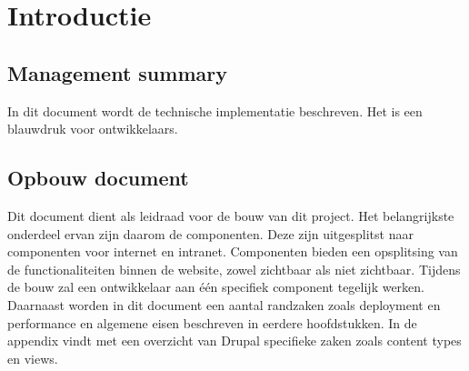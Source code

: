 
\section{Introductie}

\subsection{Management summary}
In dit document wordt de technische implementatie beschreven. Het is een blauwdruk voor ontwikkelaars. 

\subsection{Opbouw document}
Dit document dient als leidraad voor de bouw van dit project. Het belangrijkste onderdeel ervan zijn daarom de componenten. Deze zijn uitgesplitst naar componenten voor internet en intranet.  Componenten bieden een opsplitsing van de functionaliteiten binnen de website, zowel zichtbaar als niet zichtbaar. Tijdens de bouw zal een ontwikkelaar aan \'{e}\'{e}n specifiek component tegelijk werken. Daarnaast worden in dit document een aantal randzaken zoals deployment en performance en algemene eisen beschreven in eerdere hoofdstukken. In de appendix vindt met een overzicht van Drupal specifieke zaken zoals content types en views.
